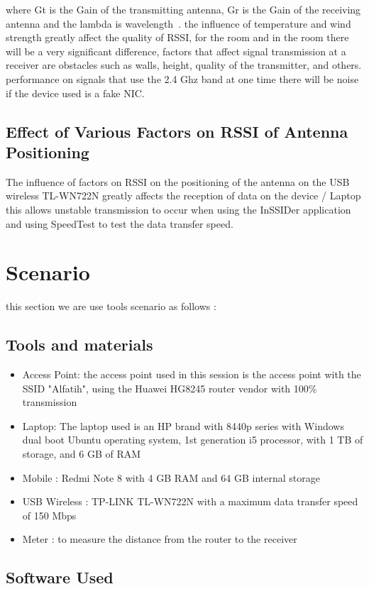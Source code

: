\documentclass[conference]{IEEEtran}
\begin{document}
where Gt is the Gain of the transmitting antenna, Gr
is the Gain of the receiving antenna and the lambda is
wavelength~. \cite{puspitasari2014analisis}
the influence of temperature and wind strength greatly affect the quality of RSSI,
for the room and in the room there will be a very significant difference, factors
that affect signal transmission at a receiver are obstacles such as walls, height, quality of the transmitter, and others.
performance on signals that use the 2.4 Ghz band at one time there will be noise if the device used is a fake NIC.

\subsection{Effect of Various Factors on RSSI of Antenna Positioning}
The influence of factors on RSSI on the positioning of the antenna on the USB wireless TL-WN722N \cite{LINK2018} greatly affects the reception of data on the device / Laptop
this allows unstable transmission to occur when using the InSSIDer application and using SpeedTest to test the data transfer speed.
\section{Scenario}

this section we are use tools scenario as follows :
\subsection{Tools and materials}

\begin{itemize}
    \item Access Point: the access point used in this session is the access point with the SSID "Alfatih", using the Huawei HG8245 router vendor with 100\% transmission
    \item Laptop: The laptop used is an HP brand with 8440p series with Windows dual boot Ubuntu operating system, 1st generation i5 processor, with 1 TB of storage, and 6 GB of RAM
    \item Mobile : Redmi Note 8 with 4 GB RAM and 64 GB internal storage
    \item USB Wireless : TP-LINK TL-WN722N with a maximum data transfer speed of 150 Mbps ~
    \item Meter : to measure the distance from the router to the receiver
\end{itemize}

\subsection{Software Used}
\end{document}
